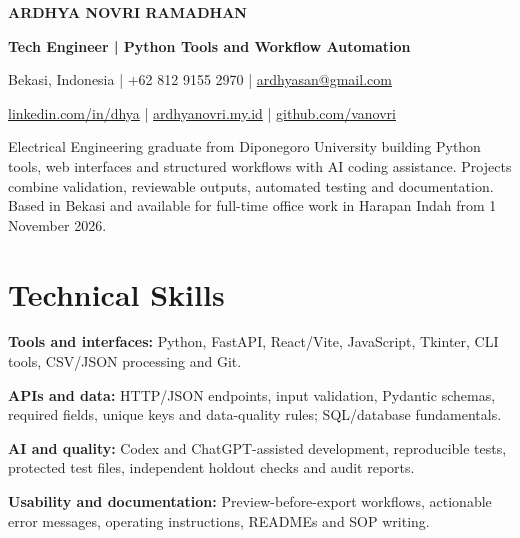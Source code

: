 \documentclass[11pt,a4paper]{article}
\begin{document}
\begin{center}
{\fontsize{20}{23}\selectfont\bfseries ARDHYA NOVRI RAMADHAN}\par
\vspace{3pt}
{\bfseries Tech Engineer | Python Tools and Workflow Automation}\par
Bekasi, Indonesia | +62 812 9155 2970 | \href{mailto:ardhyasan@gmail.com}{ardhyasan@gmail.com}\par
\href{https://www.linkedin.com/in/dhya/}{linkedin.com/in/dhya} | \href{https://ardhyanovri.my.id}{ardhyanovri.my.id} | \href{https://github.com/vanovri}{github.com/vanovri}
\end{center}
\raggedright
Electrical Engineering graduate from Diponegoro University building Python tools, web interfaces and structured workflows with AI coding assistance. Projects combine validation, reviewable outputs, automated testing and documentation. Based in Bekasi and available for full-time office work in Harapan Indah from 1 November 2026.\par
\section{Technical Skills}
\textbf{Tools and interfaces:} Python, FastAPI, React/Vite, JavaScript, Tkinter, CLI tools, CSV/JSON processing and Git.\par
\textbf{APIs and data:} HTTP/JSON endpoints, input validation, Pydantic schemas, required fields, unique keys and data-quality rules; SQL/database fundamentals.\par
\textbf{AI and quality:} Codex and ChatGPT-assisted development, reproducible tests, protected test files, independent holdout checks and audit reports.\par
\textbf{Usability and documentation:} Preview-before-export workflows, actionable error messages, operating instructions, READMEs and SOP writing.\par
\end{document}
